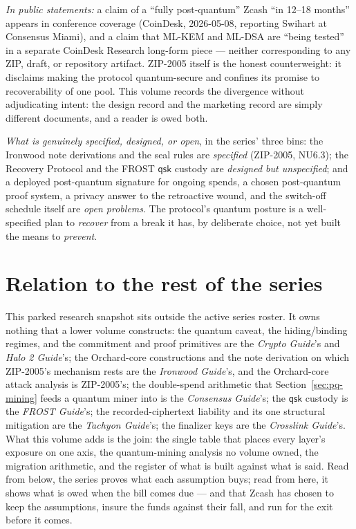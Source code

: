 \documentclass[11pt,a4paper]{article}
\theoremstyle{definition}
\begin{document}
\emph{In public statements:} a claim of a ``fully post-quantum'' Zcash
``in 12--18 months'' appears in conference coverage (CoinDesk,
2026-05-08, reporting Swihart at Consensus Miami), and a claim that
ML-KEM and ML-DSA are ``being tested'' in a separate CoinDesk Research
long-form piece --- neither corresponding to any ZIP, draft, or
repository artifact. ZIP-2005 itself is the honest counterweight:
it disclaims making the protocol quantum-secure and confines its promise
to recoverability of one pool. This volume records the divergence
without adjudicating intent: the design record and the marketing record
are simply different documents, and a reader is owed both.

\emph{What is genuinely specified, designed, or open}, in the series'
three bins: the Ironwood note derivations and the seal rules are
\emph{specified} (ZIP-2005, NU6.3); the Recovery Protocol and the FROST
$\mathsf{qsk}$ custody are \emph{designed but unspecified}; and a
deployed post-quantum signature for ongoing spends, a chosen
post-quantum proof system, a privacy answer to the retroactive wound,
and the switch-off schedule itself are \emph{open problems}. The
protocol's quantum posture is a well-specified plan to \emph{recover}
from a break it has, by deliberate choice, not yet built the means to
\emph{prevent}.

\section{Relation to the rest of the series}\label{sec:pq-relations}

This parked research snapshot sits outside the active series roster. It
owns nothing
that a lower volume constructs: the quantum caveat, the hiding/binding
regimes, and the commitment and proof primitives are the \emph{Crypto
Guide}'s and \emph{Halo 2 Guide}'s; the Orchard-core constructions and the
note derivation on which ZIP-2005's mechanism rests are the \emph{Ironwood
Guide}'s, and the Orchard-core attack analysis is ZIP-2005's; the
double-spend arithmetic that Section~\ref{sec:pq-mining} feeds a quantum
miner into is the \emph{Consensus Guide}'s; the $\mathsf{qsk}$ custody
is the \emph{FROST Guide}'s; the recorded-ciphertext liability and its
one structural mitigation are the \emph{Tachyon Guide}'s; the finalizer
keys are the \emph{Crosslink Guide}'s. What this volume adds is the
join: the single table that places every layer's exposure on one axis,
the quantum-mining analysis no volume owned, the migration arithmetic,
and the register of what is built against what is said. Read from below,
the series proves what each assumption buys; read from here, it shows
what is owed when the bill comes due --- and that Zcash has chosen to
keep the assumptions, insure the funds against their fall, and run for
the exit before it comes.
\end{document}
